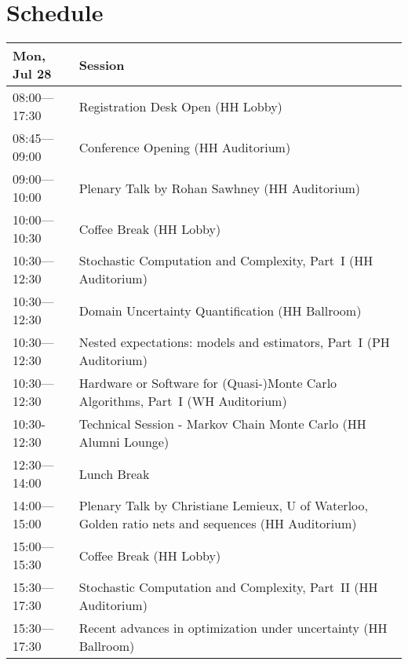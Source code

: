 \chapter{Schedule}
\begin{table}
{\footnotesize
\begin{tabularx}{\textwidth}{>{\hsize=0.32\hsize}X|>{\hsize=1.7\hsize}X}
\hline
\textbf{Mon, Jul 28} & \textbf{Session} \\
\hline
\cellcolor{\EmptyColor}08:00---17:30 & \cellcolor{\EmptyColor}Registration Desk Open (HH Lobby) \\
\cellcolor{\PlenaryColor}08:45---09:00 & \cellcolor{\PlenaryColor}Conference Opening (HH Auditorium) \\
\cellcolor{\PlenaryColor}09:00---10:00 & \cellcolor{\PlenaryColor}Plenary Talk by Rohan Sawhney (HH Auditorium) \\
\cellcolor{\EmptyColor}10:00---10:30 & \cellcolor{\EmptyColor}Coffee Break (HH Lobby) \\
\cellcolor{\SessionTitleColor}10:30---12:30 & \cellcolor{\SessionTitleColor}Stochastic Computation and Complexity, Part~I (HH Auditorium) \\
\cellcolor{\SessionTitleColor}10:30---12:30 & \cellcolor{\SessionTitleColor}Domain Uncertainty Quantification (HH Ballroom) \\
\cellcolor{\SessionTitleColor}10:30---12:30 & \cellcolor{\SessionTitleColor}Nested expectations: models and estimators, Part~I (PH Auditorium) \\
\cellcolor{\SessionTitleColor}10:30---12:30 & \cellcolor{\SessionTitleColor}Hardware or Software for (Quasi-)Monte Carlo Algorithms, Part~I (WH Auditorium) \\
\cellcolor{\SessionLightColor}10:30-12:30 & \cellcolor{\SessionLightColor}Technical Session - Markov Chain Monte Carlo (HH Alumni Lounge) \\
\cellcolor{\EmptyColor}12:30---14:00 & \cellcolor{\EmptyColor}Lunch Break \\
\cellcolor{\PlenaryColor}14:00---15:00 & \cellcolor{\PlenaryColor}Plenary Talk by Christiane Lemieux, U of Waterloo, Golden ratio nets and sequences (HH Auditorium) \\
\cellcolor{\EmptyColor}15:00---15:30 & \cellcolor{\EmptyColor}Coffee Break (HH Lobby) \\
\cellcolor{\SessionTitleColor}15:30---17:30 & \cellcolor{\SessionTitleColor}Stochastic Computation and Complexity, Part~II (HH Auditorium) \\
\cellcolor{\SessionTitleColor}15:30---17:30 & \cellcolor{\SessionTitleColor}Recent advances in optimization under uncertainty (HH Ballroom) \\

\end{tabularx}}
\end{table}
